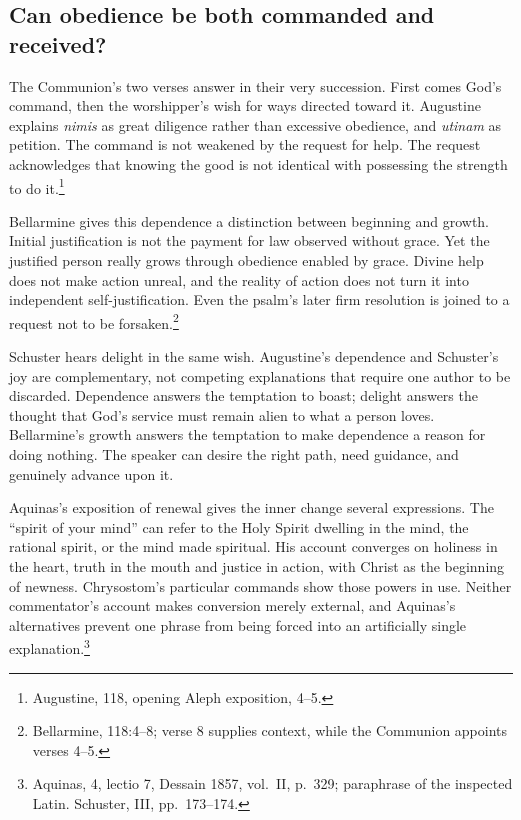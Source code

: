 \subsection{Can obedience be both commanded and received?}

The Communion's two verses answer in their very succession.
First comes God's command, then the worshipper's wish for ways
directed toward it. Augustine explains \textit{nimis} as great
diligence rather than excessive obedience, and \textit{utinam}
as petition. The command is not weakened by the request for help.
The request acknowledges that knowing the good is not identical
with possessing the strength to do it.\footnote{Augustine,
 118, opening Aleph exposition, 4--5.}

Bellarmine gives this dependence a distinction between beginning
and growth. Initial justification is not the payment for law
observed without grace. Yet the justified person really grows
through obedience enabled by grace. Divine help does not make
action unreal, and the reality of action does not turn it into
independent self-justification. Even the psalm's later firm
resolution is joined to a request not to be forsaken.\footnote{Bellarmine,
 118:4--8; verse 8 supplies context, while the
Communion appoints verses 4--5.}

Schuster hears delight in the same wish. Augustine's dependence
and Schuster's joy are complementary, not competing explanations
that require one author to be discarded. Dependence answers the
temptation to boast; delight answers the thought that God's service
must remain alien to what a person loves. Bellarmine's growth
answers the temptation to make dependence a reason for doing
nothing. The speaker can desire the right path, need guidance,
and genuinely advance upon it.

Aquinas's exposition of renewal gives the inner change several
expressions. The ``spirit of your mind'' can refer to the Holy
Spirit dwelling in the mind, the rational spirit, or the mind
made spiritual. His account converges on holiness in the heart,
truth in the mouth and justice in action, with Christ as the
beginning of newness. Chrysostom's particular commands show those
powers in use. Neither commentator's account makes conversion
merely external, and Aquinas's alternatives prevent one phrase
from being forced into an artificially single explanation.\footnote{Aquinas,  4, lectio 7, Dessain
1857, vol.~II, p.~329; paraphrase of the inspected Latin.
Schuster,  III, pp.~173--174.}

